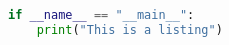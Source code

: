 \begin{lstlisting}[language=Python, float, caption={Simple Python program}, label={lst:python}]
if __name__ == "__main__":
    print("This is a listing")
\end{lstlisting}
